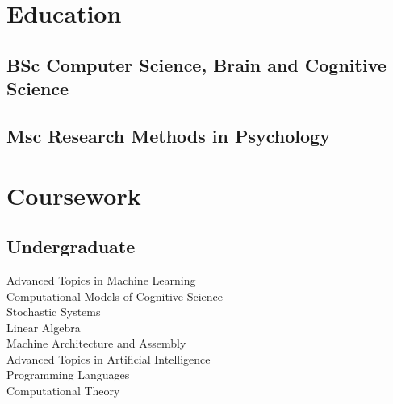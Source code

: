 \documentclass[]{csaund_resume-openfont}
\begin{document}
%
%

%
%

%
%

\begin{minipage}[t]{0.30\textwidth}


\section{Education}

\subsection{BSc Computer Science, Brain and Cognitive Science}
\sectionsep

\subsection{Msc Research Methods in Psychology}
\sectionsep




\section{Coursework}
\subsection{Undergraduate}
Advanced Topics in Machine Learning \\
Computational Models of Cognitive Science \\
Stochastic Systems \\
Linear Algebra \\
Machine Architecture and Assembly \\
Advanced Topics in Artificial Intelligence \\
Programming Languages \\
Computational Theory \\
\sectionsep


\end{minipage}
\end{document}
